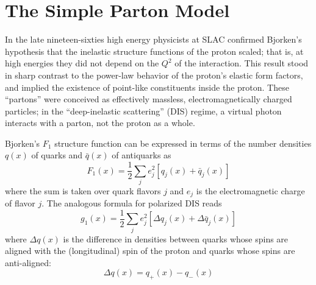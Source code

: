 \section{The Simple Parton Model}


In the late nineteen-sixties high energy physicists at SLAC confirmed Bjorken's
hypothesis that the inelastic structure functions of the proton scaled; that is,
at high energies they did not depend on the $Q^2$ of the interaction. This
result stood in sharp contrast to the power-law behavior of the proton's elastic
form factors, and implied the existence of point-like constituents inside the
proton. These ``partons'' were conceived as effectively massless,
electromagnetically charged particles; in the ``deep-inelastic scattering''
(DIS) regime, a virtual photon interacts with a parton, not the proton as a
whole.

Bjorken's $F_1$ structure function can be expressed in terms of the number densities $q(x)$ of quarks and $\bar q(x)$ of antiquarks as
%
\begin{equation}
  F_1(x) = \frac{1}{2}\sum_{j}{e_j^2[q_j(x) + \bar{q}_j(x)]}
\end{equation}
%
where the sum is taken over quark flavors $j$ and $e_j$ is the electromagnetic charge of flavor $j$.  The analogous formula for polarized DIS reads
%
\begin{equation}
  g_1(x) = \frac{1}{2}\sum_{j}{e_j^2[\Delta q_j(x) + \Delta \bar{q}_j(x)]}
\end{equation}
%
where $\Delta q(x)$ is the difference in densities between quarks whose spins are aligned with the (longitudinal) spin of the proton and quarks whose spins are anti-aligned:
\begin{equation}
  \Delta  q(x) = q_+(x) - q_-(x)
\end{equation}


